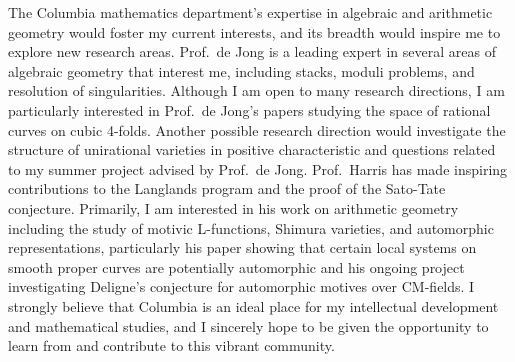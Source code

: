 \documentclass[11pt]{article}
\begin{document}
\par
The Columbia mathematics department's expertise in algebraic and arithmetic geometry would foster my current interests, and its breadth would inspire me to explore new research areas. Prof.\ de Jong is a leading expert in several areas of algebraic geometry that interest me, including stacks, moduli problems, and resolution of singularities. Although I am open to many research directions, I am particularly interested in Prof.\ de Jong’s papers studying the space of rational curves on cubic 4-folds. Another possible research direction would investigate the structure of unirational varieties in positive characteristic and questions related to my summer project advised by Prof.\ de Jong. Prof.\ Harris has made inspiring contributions to the Langlands program and the proof of the Sato-Tate conjecture. Primarily, I am interested in his work on arithmetic geometry including the study of motivic L-functions, Shimura varieties, and automorphic representations, particularly his paper showing that certain local systems on smooth proper curves are potentially automorphic and his ongoing project investigating Deligne’s conjecture for automorphic motives over CM-fields. I strongly believe that Columbia is an ideal place for my intellectual development and mathematical studies, and I sincerely hope to be given the opportunity to learn from and contribute to this vibrant community.
\end{document}
